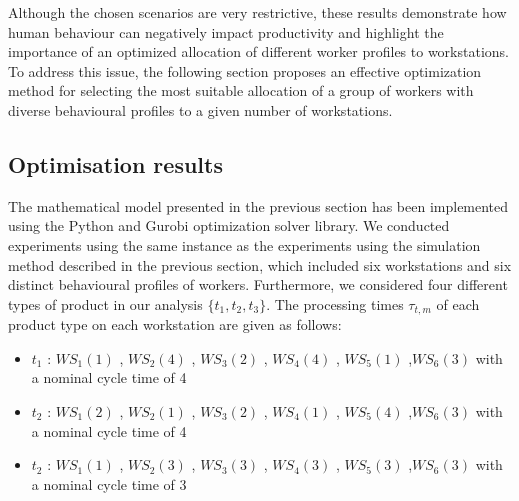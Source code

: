 \documentclass[review,12pt, 3p, times]{elsarticle}
\begin{document}
Although the chosen scenarios are very restrictive, these results demonstrate how human behaviour can negatively impact productivity and highlight the importance of an optimized allocation of different worker profiles to workstations. To address this issue, the following section proposes an effective optimization method for selecting the most suitable allocation of a group of workers with diverse behavioural profiles to a given number of workstations.


\subsection{Optimisation results}
The mathematical model presented in the previous section has been implemented using the Python and Gurobi optimization solver library. 
We conducted experiments using the same instance as the experiments using the simulation method described in the previous section, which included six workstations and six distinct behavioural profiles of workers. Furthermore, we considered four different types of product in our analysis $\{t_1, t_2, t_3\}$. The processing times $\tau_{t,m}$ of each product type on each workstation are given as follows:

	 
\begin{itemize}
	\item $t_1$ : $\textit{WS}_1(1)$ , $\textit{WS}_2(4)$ , $\textit{WS}_3(2)$ , $\textit{WS}_4(4)$ , $\textit{WS}_5(1)$ ,$\textit{WS}_6(3)$ with a nominal cycle time of 4
	\item $t_2$ : $\textit{WS}_1(2)$ , $\textit{WS}_2(1)$ , $\textit{WS}_3(2)$ , $\textit{WS}_4(1)$ , $\textit{WS}_5(4)$ ,$\textit{WS}_6(3)$ with a nominal cycle time of 4
	\item $t_2$ : $\textit{WS}_1(1)$ , $\textit{WS}_2(3)$ , $\textit{WS}_3(3)$ , $\textit{WS}_4(3)$ , $\textit{WS}_5(3)$ ,$\textit{WS}_6(3)$ with a nominal cycle time of 3
\end{itemize}
					
\end{document}
